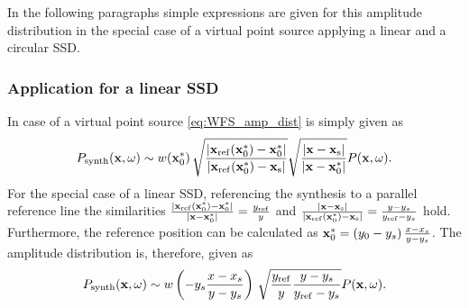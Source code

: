 \documentclass[lettersize,journal]{IEEEtran}
\begin{document}
In the following paragraphs simple expressions are given for this amplitude distribution in the special case of a virtual point source applying a linear and a circular SSD.
\subsubsection{Application for a linear SSD}
In case of a virtual point source \eqref{eq:WFS_amp_dist} is simply given as
\begin{equation}
  P_{\mathrm{synth}}(\mathbf{x},\omega) \sim w(\mathbf{x}_0^*) \, \sqrt{\frac{  |\mathbf{x}_{\mathrm{ref}}(\mathbf{x}_0^*)-\mathbf{x}_0^*| }{ |\mathbf{x}_{\mathrm{ref}}(\mathbf{x}_0^*)-\mathbf{x}_{\mathrm{s}}|} } 
  \sqrt{\frac{|\mathbf{x}-\mathbf{x}_{\mathrm{s}}|}{|\mathbf{x}-\mathbf{x}_0^*|}} P(\mathbf{x},\omega).
\end{equation}
For the special case of a linear SSD, referencing the synthesis to a parallel reference line the similarities $\frac{  |\mathbf{x}_{\mathrm{ref}}(\mathbf{x}_0^*)-\mathbf{x}_0^*| }{ |\mathbf{x}-\mathbf{x}_0^*|} = \frac{y_{\mathrm{ref}}}{y}$ and $\frac{|\mathbf{x}-\mathbf{x}_{\mathrm{s}}|}{|\mathbf{x}_{\mathrm{ref}}(\mathbf{x}_0^*)-\mathbf{x}_{\mathrm{s}}|} = \frac{y-y_s}{y_{\mathrm{ref}}-y_s}$ hold.
Furthermore, the reference position can be calculated as $\mathbf{x}_0^* = \left( y_0 - y_s \right)\frac{x-x_s}{y-y_s}$.
The amplitude distribution is, therefore, given as
\begin{equation}
  P_{\mathrm{synth}}(\mathbf{x},\omega) \sim w\left( -y_s \frac{x-x_s}{y-y_s} \right) \, \sqrt{\frac{y_{\mathrm{ref}}}{y} \frac{y-y_s}{y_{\mathrm{ref}}-y_s}} 
P(\mathbf{x},\omega).
\label{eq:trad_25D_WFS_amp_dist}
\end{equation}
\end{document}
